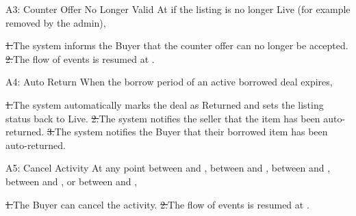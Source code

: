 \begin{flowblock}{A3: Counter Offer No Longer Valid}
At  if the listing is no longer Live (for example removed by the admin),\par
\st{1.}{The system informs the Buyer that the counter offer can no longer be accepted.}
\st{2.}{The flow of events is resumed at .}
\end{flowblock}
\begin{flowblock}{A4: Auto Return}
When the borrow period of an active borrowed deal expires,\par
\st{1.}{The system automatically marks the deal as Returned and sets the listing status back to Live.}
\st{2.}{The system notifies the seller that the item has been auto-returned.}
\st{3.}{The system notifies the Buyer that their borrowed item has been auto-returned.}
\end{flowblock}
\begin{flowblock}{A5: Cancel Activity}
At any point between  and , between  and , between  and , between  and , or between  and ,\par
\st{1.}{The Buyer can cancel the activity.}
\st{2.}{The flow of events is resumed at .}
\end{flowblock}

